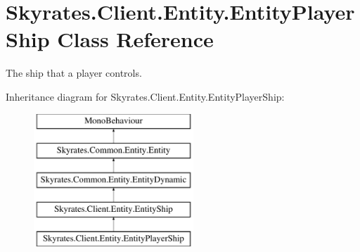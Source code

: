 \hypertarget{class_skyrates_1_1_client_1_1_entity_1_1_entity_player_ship}{\section{Skyrates.\-Client.\-Entity.\-Entity\-Player\-Ship Class Reference}
\label{class_skyrates_1_1_client_1_1_entity_1_1_entity_player_ship}
}


The ship that a player controls.  


Inheritance diagram for Skyrates.\-Client.\-Entity.\-Entity\-Player\-Ship\-:\begin{figure}[H]
\begin{center}
\leavevmode
\includegraphics[height=5.000000cm]{class_skyrates_1_1_client_1_1_entity_1_1_entity_player_ship}
\end{center}
\end{figure}
